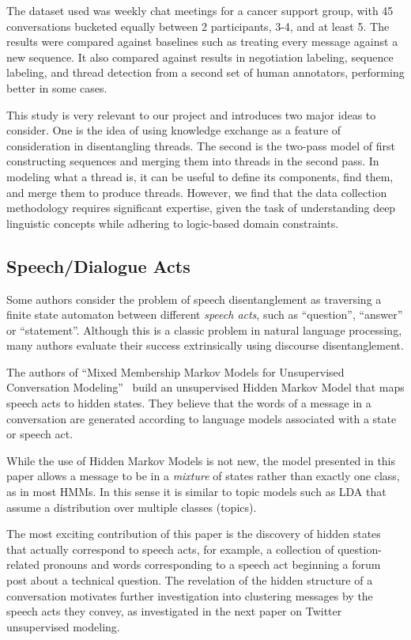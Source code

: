 \documentclass[10pt]{article}
\newcommand{\titlecite}[2]{``#1''~\cite{#2}}
\begin{document}
The dataset used was weekly chat meetings for a cancer support group, with 45
conversations bucketed equally between 2 participants, 3-4, and at least 5. The
results were compared against baselines such as treating every message against
a new sequence. It also compared against results in negotiation labeling,
sequence labeling, and thread detection from a second set of human annotators,
performing better in some cases.

This study is very relevant to our project and introduces two major ideas to
consider. One is the idea of using knowledge exchange as a feature of
consideration in disentangling threads. The second is the two-pass model of
first constructing sequences and merging them into threads in the second pass.
In modeling what a thread is, it can be useful to define its components,
find them, and merge them to produce threads. However, we find that the
data collection methodology requires significant expertise, given the task of
understanding deep linguistic concepts while adhering to logic-based domain
constraints.

\subsection{Speech/Dialogue Acts}
Some authors consider the problem of speech disentanglement as traversing 
a finite state automaton between different \textit{speech acts}, such as
``question'', ``answer'' or ``statement''. Although this is a classic problem in
natural language processing, many authors evaluate their success extrinsically 
using discourse disentanglement.

The authors of \titlecite{Mixed Membership Markov Models for Unsupervised
Conversation Modeling}{Paula} build an unsupervised Hidden Markov Model that 
maps speech acts to hidden states. They believe that the words of a message 
in a conversation are generated according to language models associated
with a state or speech act. 

While the use of Hidden Markov Models is not new, the model presented in this
paper allows a message to be in a \emph{mixture} of states rather than exactly
one class, as in most HMMs. In this sense it is similar to topic models such as
LDA that assume a distribution over multiple classes (topics).

The most exciting contribution of this paper is the discovery of hidden states
that actually correspond to speech acts, for example, a collection of
question-related pronouns and words corresponding to a speech act beginning a
forum post about a technical question. The revelation of the hidden structure of
a conversation motivates further investigation into clustering messages by the
speech acts they convey, as investigated in the next paper on Twitter
unsupervised modeling.
\end{document}
